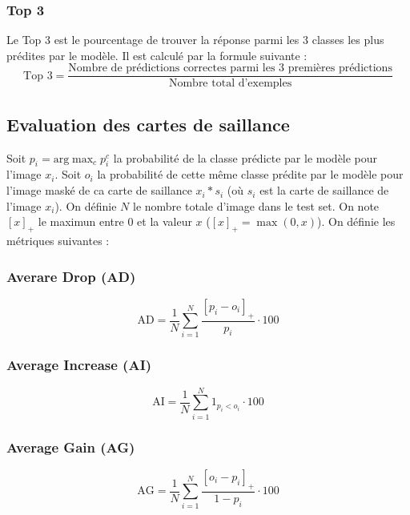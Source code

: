\subsubsection{Top 3}
Le Top 3 est le pourcentage de trouver la réponse parmi les 3 classes les plus prédites par le modèle. Il est calculé par la formule suivante :
\begin{equation}
    \text{Top 3} = \frac{\text{Nombre de prédictions correctes parmi les 3 premières prédictions}}{\text{Nombre total d'exemples}}
\end{equation}

\subsection{Evaluation des cartes de saillance}
\label{sec: grad metrics}

Soit $p_i = \text{arg}\max_c p_i^c$ la probabilité de la classe prédicte par le modèle pour l'image $x_i$. Soit $o_i$ la probabilité de cette même classe prédite par le modèle pour l'image maské de ca carte de saillance $x_i * s_i$ (où $s_i$ est la carte de saillance de l'image $x_i$). On définie $N$ le nombre totale d'image dans le test set. On note $[x]_+$ le maximun entre $0$ et la valeur $x$ ($[x]_+=\max(0, x)$). On définie les métriques suivantes :

\subsubsection{Averare Drop (AD)}
\begin{equation}
    \text{AD} = \frac{1}{N} \sum_{i=1}^{N} \frac{[p_i - o_i]_+}{p_i} \cdot 100
\end{equation}

\subsubsection{Average Increase (AI)}
\begin{equation}
    \text{AI} = \frac{1}{N} \sum_{i=1}^{N} 1_{p_i<o_i} \cdot 100
\end{equation}

\subsubsection{Average Gain (AG)}
\begin{equation}
    \text{AG} = \frac{1}{N} \sum_{i=1}^{N} \frac{[o_i - p_i]_+}{1 - p_i} \cdot 100
\end{equation}